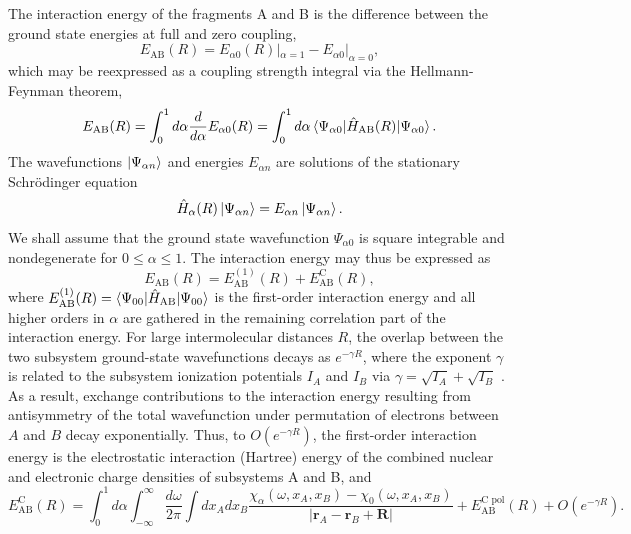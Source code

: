 \documentclass[twoside,twocolumn,9pt]{article}
\newcommand{\x}{\mathbf{r}}
\begin{document}
The interaction energy of the fragments A and B is the difference
between the ground state energies at full and zero coupling,
\begin{equation}
  E_{\text{AB}}(R) = E_{\alpha 0}(R)|_{\alpha=1} - E_{\alpha 0}|_{\alpha=0},
\end{equation}
which may be reexpressed as a coupling strength integral via the
Hellmann-Feynman theorem,
\begin{equation}
  E_{\text{AB}}(R) = \int_0^1 d\alpha \frac{d}{d \alpha} E_{\alpha 0}(R)
  = \int_0^1 d \alpha \braket{\Psi_{\alpha
      0}|\hat{H}_{\text{AB}}(R)|\Psi_{\alpha 0}}.
\end{equation}
The wavefunctions $\ket{\Psi_{\alpha n}}$ and energies $E_{\alpha n}$
are solutions of the stationary Schr{\"o}dinger equation
\begin{equation}
  \hat{H}_{\alpha}(R) \ket{\Psi_{\alpha n}} =  E_{\alpha n}
  \ket{\Psi_{\alpha n}}.
\end{equation}
We shall assume that the ground state wavefunction $\Psi_{\alpha 0}$ is
square integrable and nondegenerate for $0 \leq \alpha \leq 1$. The
interaction energy may thus be expressed as
\begin{equation}
  E_{\text{AB}}(R) = E^{(1)}_{\text{AB}}(R) + E^{\text{C}}_{\text{AB}}(R),
\end{equation}
where $E^{(1)}_{\text{AB}}(R) = \braket{\Psi_{0 0}|\hat{H}_{\text{AB}}|
  \Psi_{0 0}}$ is the first-order interaction energy and all
higher orders in $\alpha$ are gathered in the remaining correlation
part of the interaction energy. For large intermolecular distances $R$,
the overlap between the two subsystem ground-state wavefunctions decays
as $e^{-\gamma R}$, where 
the exponent $\gamma$ is related to the subsystem ionization potentials
$I_A$ and $I_B$ via $\gamma = \sqrt{I_A} + \sqrt{I_B}$
. As a result, exchange contributions to the interaction
energy resulting from antisymmetry of the total wavefunction under
permutation of electrons between $A$ and $B$ decay exponentially. Thus,
to $O(e^{-\gamma R})$, the first-order interaction energy is the
electrostatic interaction (Hartree) energy of the combined nuclear and
electronic charge densities of subsystems A and B, and
\begin{equation}
  E^{\text{C}}_{\text{AB}}(R) = \int_0^1
  d\alpha \int_{-\infty}^{\infty} \frac{d\omega}{2 \pi}  \int dx_A
  dx_B \frac{ 
    \chi_{\alpha}(\omega,x_A,x_B) - \chi_{0}(\omega,x_A,x_B) }{
    |\x_A-\x_B+\mathbf{R}|} + E^{\text{C pol}}_{\text{AB}}(R) + O(e^{-\gamma R}).
\end{equation}
\end{document}
